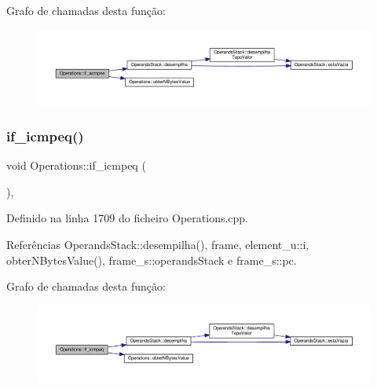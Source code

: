 Grafo de chamadas desta função\+:\nopagebreak
\begin{figure}[H]
\begin{center}
\leavevmode
\includegraphics[width=350pt]{classOperations_a7f43bbfba9b2feb66b695d24c43dc430_cgraph}
\end{center}
\end{figure}
\mbox{\label{classOperations_a43a49ccd4f1160c0b1968af4296fa2b3}} 
\subsubsection{\texorpdfstring{if\+\_\+icmpeq()}{if\_icmpeq()}}
{\footnotesize\ttfamily void Operations\+::if\+\_\+icmpeq (\begin{DoxyParamCaption}{ }\end{DoxyParamCaption})\hspace{0.3cm}{\ttfamily [static]}, {\ttfamily [private]}}



Definido na linha 1709 do ficheiro Operations.\+cpp.



Referências Operands\+Stack\+::desempilha(), frame, element\+\_\+u\+::i, obter\+N\+Bytes\+Value(), frame\+\_\+s\+::operands\+Stack e frame\+\_\+s\+::pc.

Grafo de chamadas desta função\+:\nopagebreak
\begin{figure}[H]
\begin{center}
\leavevmode
\includegraphics[width=350pt]{classOperations_a43a49ccd4f1160c0b1968af4296fa2b3_cgraph}
\end{center}
\end{figure}
\mbox{\label{classOperations_a147f088fabd19030a535ac68ff091be1}} 
